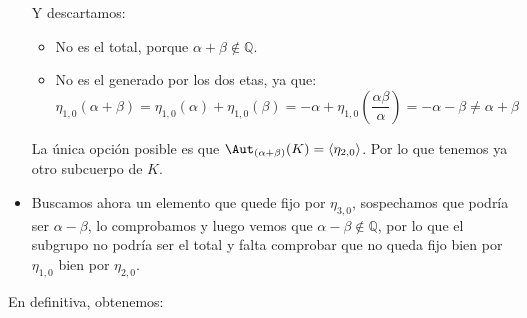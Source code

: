 \begin{ejemplo}
\begin{itemize}
\begin{equation*}
            \end{equation*}
            Y descartamos:
            \begin{itemize}
                \item No es el total, porque $\alpha+\beta\notin \mathbb{Q}$.
                \item No es el generado por los dos etas, ya que:
                    \begin{equation*}
                        \eta_{1,0}(\alpha+\beta) = \eta_{1,0}(\alpha) + \eta_{1,0}(\beta) = -\alpha + \eta_{1,0}\left(\frac{\alpha\beta}{\alpha}\right) = -\alpha-\beta \neq \alpha + \beta
                    \end{equation*}
            \end{itemize}
            La única opción posible es que $\Aut_{(\alpha+\beta)}(K) = \langle \eta_{2,0} \rangle $. Por lo que tenemos ya otro subcuerpo de $K$.
        \item Buscamos ahora un elemento que quede fijo por $\eta_{3,0}$, sospechamos que podría ser $\alpha-\beta$, lo comprobamos y luego vemos que $\alpha-\beta\notin \mathbb{Q}$, por lo que el subgrupo no podría ser el total y falta comprobar que no queda fijo bien por $\eta_{1,0}$ bien por $\eta_{2,0}$.
    \end{itemize}
    En definitiva, obtenemos:
    \begin{figure}[H]
        \centering
\end{figure}
\end{ejemplo}
